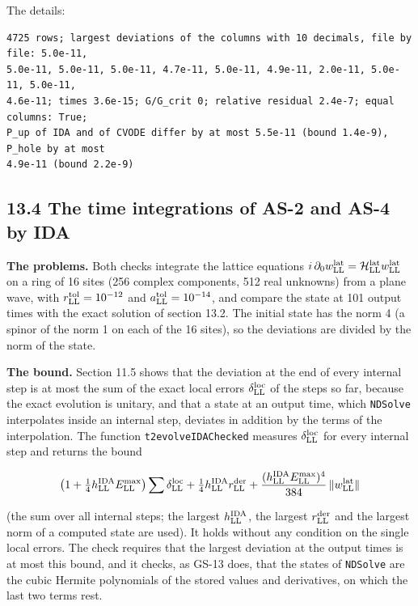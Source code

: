 \documentclass[
  10pt,
]{article}
\begin{document}
The details:

\begin{verbatim}
4725 rows; largest deviations of the columns with 10 decimals, file by file: 5.0e-11,
5.0e-11, 5.0e-11, 5.0e-11, 4.7e-11, 5.0e-11, 4.9e-11, 2.0e-11, 5.0e-11, 5.0e-11,
4.6e-11; times 3.6e-15; G/G_crit 0; relative residual 2.4e-7; equal columns: True;
P_up of IDA and of CVODE differ by at most 5.5e-11 (bound 1.4e-9), P_hole by at most
4.9e-11 (bound 2.2e-9)
\end{verbatim}

\hypertarget{the-time-integrations-of-as-2-and-as-4-by-ida}{%
\subsection{13.4 The time integrations of AS-2 and AS-4 by
IDA}\label{the-time-integrations-of-as-2-and-as-4-by-ida}}

\textbf{The problems.} Both checks integrate the lattice equations
\(i\,\partial_0w^{\rm lat}_{\rm LL}=\mathcal H^{\rm lat}_{\rm LL}w^{\rm lat}_{\rm LL}\)
on a ring of 16 sites (256 complex components, 512 real unknowns) from a
plane wave, with \(r^{\rm tol}_{\rm LL}=10^{-12}\) and
\(a^{\rm tol}_{\rm LL}=10^{-14}\), and compare the state at 101 output
times with the exact solution of section 13.2. The initial state has the
norm 4 (a spinor of the norm 1 on each of the 16 sites), so the
deviations are divided by the norm of the state.

\textbf{The bound.} Section 11.5 shows that the deviation at the end of
every internal step is at most the sum of the exact local errors
\(\delta^{\rm loc}_{\rm LL}\) of the steps so far, because the exact
evolution is unitary, and that a state at an output time, which
\texttt{NDSolve} interpolates inside an internal step, deviates in
addition by the terms of the interpolation. The function
\texttt{t2evolveIDAChecked} measures \(\delta^{\rm loc}_{\rm LL}\) for
every internal step and returns the bound

\[\big(1+\tfrac14h^{\rm IDA}_{\rm LL}E^{\rm max}_{\rm LL}\big)\sum\delta^{\rm loc}_{\rm LL}+\tfrac14h^{\rm IDA}_{\rm LL}r^{\rm der}_{\rm LL}+\frac{(h^{\rm IDA}_{\rm LL}E^{\rm max}_{\rm LL})^4}{384}\,\lVert w^{\rm lat}_{\rm LL}\rVert\]

(the sum over all internal steps; the largest \(h^{\rm IDA}_{\rm LL}\),
the largest \(r^{\rm der}_{\rm LL}\) and the largest norm of a computed
state are used). It holds without any condition on the single local
errors. The check requires that the largest deviation at the output
times is at most this bound, and it checks, as GS-13 does, that the
states of \texttt{NDSolve} are the cubic Hermite polynomials of the
stored values and derivatives, on which the last two terms rest.
\end{document}

